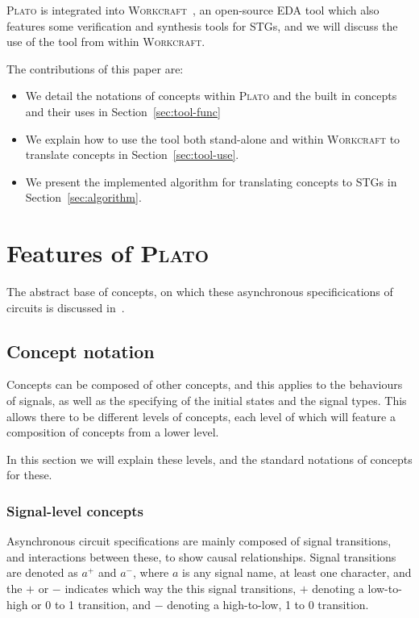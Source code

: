\documentclass[british,conference,compsoc]{IEEEtran}
\newcommand{\noun}[1]{\textsc{#1}}
\begin{document}
\noun{Plato} is 
integrated into \noun{Workcraft}~\cite{Workcraft_website}, an open-source 
EDA tool which also features some verification and synthesis tools for STGs, 
and we will discuss the use of the tool from within \noun{Workcraft}.

The contributions of this paper are:
\vspace{-1mm}
\begin{itemize}
  \item We detail the notations of concepts within \noun{Plato} and the built in
  concepts and their uses in Section~\ref{sec:tool-func}
  \item We explain how to use the tool both stand-alone and within
  \noun{Workcraft} to translate concepts in Section~\ref{sec:tool-use}.
  \item We present the implemented algorithm for translating concepts to STGs
  in Section~\ref{sec:algorithm}.
\end{itemize}

\section{Features of \noun{Plato}\label{sec:tool-func}}

\vspace{-3mm}

The abstract base of concepts, on which these asynchronous specificications of 
circuits is discussed in~\cite{2015_Beaumont_MEMOCODE}.

\vspace{-3mm}

\subsection{Concept notation \label{sub:concept-notation}}

\vspace{-3mm}

Concepts can be composed of other concepts, and this applies to the behaviours 
of signals, as well as the specifying of the initial states and the signal 
types. This allows there to be different levels of concepts, each level of 
which will feature a composition of concepts from a lower level. 

In this section we will explain these levels, and the standard notations of 
concepts for these. 

\vspace{-2mm}

\subsubsection{\label{signal-level}Signal-level concepts}Asynchronous circuit 
specifications are mainly composed of signal transitions, and interactions 
between these, to show causal relationships. Signal transitions are denoted as 
$a^{+}$ and $a^{-}$, where $a$ is any signal name, at least one character, and 
the $+$ or $-$ indicates which way the this signal transitions, $+$ denoting a 
low-to-high or 0 to 1 transition, and $-$ denoting a high-to-low, 1 to 0 
transition. 
\end{document}
